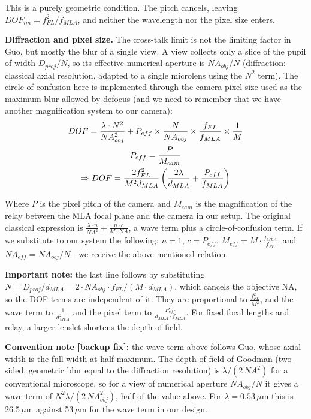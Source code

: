 This is a purely geometric condition. The pitch cancels, leaving $DOF_{im}=f_{FL}^2/f_{MLA}$, and neither the wavelength nor the pixel size enters.

\textbf{Diffraction and pixel size.} The cross-talk limit is not the limiting factor in Guo, but mostly the blur of a single view. A view collects only a slice of the pupil of width $D_{proj}/N$, so its effective numerical aperture is $NA_{obj}/N$ (diffraction: classical axial resolution, adapted to a single microlens using the $N^2$ term). The circle of confusion here is implemented through the camera pixel size used as the maximum blur allowed by defocus (and we need to remember that we have another magnification system to our camera):
\begin{gather}
    DOF = \frac{\lambda \cdot N^2}{NA_{obj}^2}+P_{eff}\times \frac{N}{NA_{obj}}\times \frac{f_{FL}}{f_{MLA}}\times \frac{1}{M} \\
    P_{eff} = \frac{P}{M_{cam}} \notag \\
    \Rightarrow DOF = \frac{2 f_{FL}^2}{M^2 d_{MLA}}\left(\frac{2\lambda}{d_{MLA}}+\frac{P_{eff}}{f_{MLA}}\right)
\end{gather}

Where $P$ is the pixel pitch of the camera and $M_{cam}$ is the magnification of the relay between the MLA focal plane and the camera in our setup. The original classical expression is $\frac{\lambda\cdot n}{NA^2}+\frac{n\cdot c}{M\cdot NA}$, a wave term plus a circle-of-confusion term. If we substitute to our system the following: $n=1$, $c=P_{eff}$, $M_{eff}=M\cdot \frac{f_{MLA}}{f_{FL}}$, and $NA_{eff}=NA_{obj}/N$ - we receive the above-mentioned relation.

\textbf{Important note: } the last line follows by substituting $N = D_{proj}/d_{MLA} = 2\cdot NA_{obj}\cdot f_{FL}/(M\cdot d_{MLA})$, which cancels the objective NA, so the DOF terms are independent of it. They are proportional to $\frac{f_{FL}^2}{M^2}$, and the wave term to $\frac{1}{d_{MLA}^2}$ and the pixel term to $\frac{P_{eff}}{d_{MLA}\cdot f_{MLA}}$. For fixed focal lengths and relay, a larger lenslet shortens the depth of field.

\textbf{Convention note [backup fix]: } the wave term above follows Guo, whose axial width is the full width at half maximum. The depth of field of Goodman (two-sided, geometric blur equal to the diffraction resolution) is $\lambda/(2\,NA^2)$ for a conventional microscope, so for a view of numerical aperture $NA_{obj}/N$ it gives a wave term of $N^2\lambda/(2\,NA_{obj}^2)$, half of the value above. For $\lambda=0.53\,\mu\mathrm{m}$ this is 26.5\,$\mu$m against 53\,$\mu$m for the wave term in our design.


